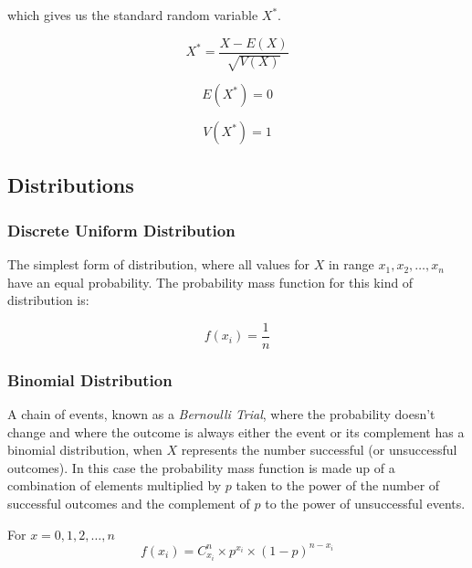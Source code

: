 \documentclass[12pt]{article}
\begin{document}
	\noindent which gives us the standard random variable \(X^*\).
	
	\begin{equation*}
		X^*= \frac{X-E(X)}{\sqrt{V(X)}}
	\end{equation*}
	
	\begin{equation*}
		E(X^*)= 0
	\end{equation*}
	
	\begin{equation*}
		V(X^*)= 1
	\end{equation*}
	
	\newpage
	\subsection{Distributions}
	
		\subsubsection{Discrete Uniform Distribution}
		
		The simplest form of distribution, where all values for \(X\) in range \(x_1, x_2,\ldots ,x_n\) have an equal probability. The probability mass function for this kind of distribution is:
		
		\begin{equation*}
		f(x_i)=\frac{1}{n}
		\end{equation*}
	
	\subsubsection{Binomial Distribution}
	
	A chain of events, known as a \emph{Bernoulli Trial}, where the probability doesn't change and where the outcome is always either the event or its complement has a binomial distribution, when \(X\) represents the number successful (or unsuccessful outcomes). In this case the probability mass function is made up of a combination of elements multiplied by \(p\) taken to the power of the number of successful outcomes and the complement of \(p\) to the power of unsuccessful events.
	\newline
	
	\noindent For \(x=0, 1, 2,\ldots ,n\)
	\begin{equation*}
	f(x_{i})=C^{n}_{x_{i}}\times p^{x_{i}}\times (1-p)^{n-x_{i}}
	\end{equation*}
	
\end{document}
